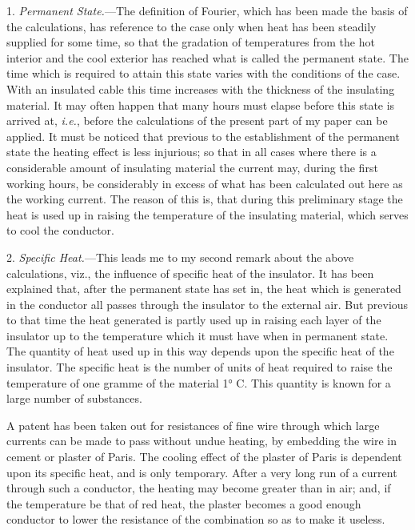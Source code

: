 \documentclass[12pt,oneside]{book}[2021/10/04]
\newcommand{\ie}{\textit{i.e.}}
\begin{document}
1. \textit{Permanent State.}—The definition of Fourier, which has
been made the basis of the calculations, has reference to the case
only when heat has been steadily supplied for some time, so that
the gradation of temperatures from the hot interior and the cool
exterior has reached what is called the permanent state. The
time which is required to attain this state varies with the conditions
of the case. With an insulated cable this time increases
with the thickness of the insulating material. It may often
happen that many hours must elapse before this state is arrived
at, \ie, before the calculations of the present part of my paper
can be applied. It must be noticed that previous to the establishment
of the permanent state the heating effect is less injurious;
so that in all cases where there is a considerable amount of
insulating material the current may, during the first working
hours, be considerably in excess of what has been calculated out
here as the working current. The reason of this is, that during
this preliminary stage the heat is used up in raising the temperature
of the insulating material, which serves to cool the
conductor.

2. \textit{Specific Heat.}—This leads me to my second remark about
the above calculations, viz., the influence of specific heat of the
insulator. It has been explained that, after the permanent state
has set in, the heat which is generated in the conductor all passes
through the insulator to the external air. But previous to that
time the heat generated is partly used up in raising each layer of
the insulator up to the temperature which it must have when in
permanent state. The quantity of heat used up in this way
depends upon the specific heat of the insulator. The specific heat
is the number of units of heat required to raise the temperature
of one gramme of the material 1° C\@. This quantity is known for
a large number of substances.

A patent has been taken out for resistances of fine wire through
which large currents can be made to pass without undue heating,
by embedding the wire in cement or plaster of Paris. The cooling
effect of the plaster of Paris is dependent upon its specific heat,
and is only temporary. After a very long run of a current through
such a conductor, the heating may become greater than in air;
and, if the temperature be that of red heat, the plaster becomes a
good enough conductor to lower the resistance of the combination
so as to make it useless.
\end{document}
